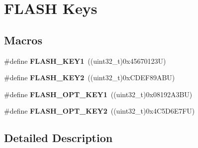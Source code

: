 \hypertarget{group___f_l_a_s_h___keys}{}\section{F\+L\+A\+SH Keys}
\label{group___f_l_a_s_h___keys}
\subsection*{Macros}
\begin{DoxyCompactItemize}
\item 
\mbox{\label{group___f_l_a_s_h___keys_gafd77e7bf91765d891ce63e2f0084b019}} 
\#define {\bfseries F\+L\+A\+S\+H\+\_\+\+K\+E\+Y1}~((uint32\+\_\+t)0x45670123\+U)
\item 
\mbox{\label{group___f_l_a_s_h___keys_gaee83d0f557e158da52f4a205db6b60a7}} 
\#define {\bfseries F\+L\+A\+S\+H\+\_\+\+K\+E\+Y2}~((uint32\+\_\+t)0x\+C\+D\+E\+F89\+A\+B\+U)
\item 
\mbox{\label{group___f_l_a_s_h___keys_gacebe54ff9ff12abcf0e4d3e697b2f116}} 
\#define {\bfseries F\+L\+A\+S\+H\+\_\+\+O\+P\+T\+\_\+\+K\+E\+Y1}~((uint32\+\_\+t)0x08192\+A3\+B\+U)
\item 
\mbox{\label{group___f_l_a_s_h___keys_ga636d46db38e376f0483eed4b7346697c}} 
\#define {\bfseries F\+L\+A\+S\+H\+\_\+\+O\+P\+T\+\_\+\+K\+E\+Y2}~((uint32\+\_\+t)0x4\+C5\+D6\+E7\+F\+U)
\end{DoxyCompactItemize}


\subsection{Detailed Description}
